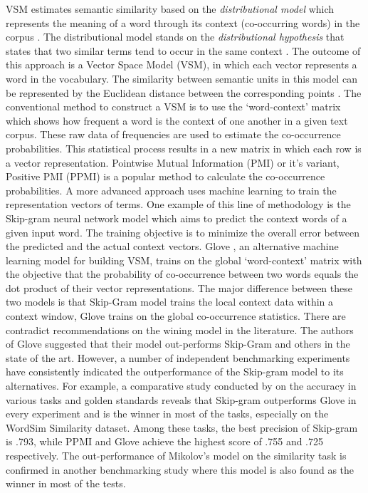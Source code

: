 \documentclass[Journal, BackFigs,NoLists, DoubleSpace]{ascelike}%
\begin{document}
VSM estimates semantic similarity based on the \textit{distributional model} which represents the meaning of a word through its context (co-occurring words) in the corpus \cite{erk12}. The distributional model stands on the \textit{distributional hypothesis} that states that two similar terms tend to occur in the same context \cite{Harris54}. The outcome of this approach is a Vector Space Model (VSM), in which each vector represents a word in the vocabulary. The similarity between semantic units in this model can be represented by the Euclidean distance between the corresponding points \cite{erk12}. The conventional method to construct a VSM is to use the `word-context' matrix which shows how frequent a word is the context of one another in a given text corpus. These raw data of frequencies are used to estimate the co-occurrence probabilities. This statistical process results in a new matrix in which each row is a vector representation. Pointwise Mutual Information (PMI) \cite{church90} or it's variant, Positive PMI (PPMI) is a popular method to calculate the co-occurrence probabilities. A more advanced approach uses machine learning to train the representation vectors of terms. One example of this line of methodology is the Skip-gram neural network model \cite{mikolov13a} which aims to predict the context words of a given input word. The training objective is to minimize the overall error between the predicted and the actual context vectors. Glove \cite{pennington2014glove}, an alternative machine learning model for building VSM, trains on the global `word-context' matrix with the objective that the probability of co-occurrence between two words equals the dot product of their vector representations. The major difference between these two models is that Skip-Gram model trains the local context data within a context window, Glove trains on the global co-occurrence statistics. There are contradict recommendations on the wining model in the literature. The authors of Glove suggested that their model out-performs Skip-Gram and others in the state of the art. However, a number of independent benchmarking experiments have consistently indicated the outperformance of the Skip-gram model to its alternatives. For example, a comparative study conducted by  on the accuracy in various tasks and golden standards reveals that Skip-gram outperforms Glove in every experiment and is the winner in most of the tasks, especially on the WordSim Similarity dataset. Among these tasks, the best precision of Skip-gram is .793, while PPMI and Glove achieve the highest score of .755 and .725 respectively.  The out-performance of Mikolov's model on the similarity task is confirmed in another benchmarking study \cite{hill15} where this model is also found as the winner in most of the tests. 
\end{document}
